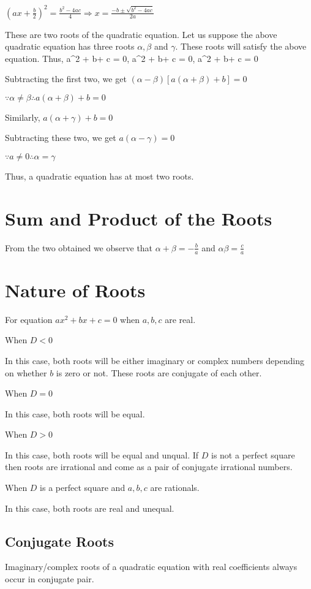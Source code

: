 $\left(ax + \frac{b}{2}\right)^2 = \frac{b^2 - 4ac}{4} \Rightarrow x = \frac{-b \pm\sqrt{b^2 - 4ac}}{2a}$

These are two roots of the quadratic equation. Let us suppose the above quadratic equation has three roots $\alpha, \beta$ and
$\gamma$. These roots will satisfy the above equation. Thus,
\startformula a\alpha^2 + b\alpha + c = 0, a\beta^2 + b\beta + c = 0, a\gamma^2 + b\gamma + c = 0\stopformula

Subtracting the first two, we get $(\alpha - \beta)[a(\alpha + \beta) + b] = 0$

$\because \alpha \neq \beta \therefore a(\alpha + \beta) + b = 0$

Similarly, $a(\alpha + \gamma) + b = 0$

Subtracting these two, we get $a(\alpha - \gamma) = 0$

$\because a\neq 0 \therefore \alpha = \gamma$

Thus, a quadratic equation has at most two roots.

\section{Sum and Product of the Roots}
From the two obtained  we observe that $\alpha + \beta = -\frac{b}{a}$ and $\alpha\beta = \frac{c}{a}$

\section{Nature of Roots}
For equation $ax^2 + bx + c = 0$ when $a,b,c$ are real.
\startitemize[n]
\item When $D < 0$

  In this case, both roots will be either imaginary or complex numbers depending on whether $b$ is zero or not. These roots are
  conjugate of each other.
\item When $D = 0$

  In this case, both roots will be equal.
\item When $D > 0$

  In this case, both roots will be equal and unqual. If $D$ is not a perfect square then roots are irrational and come as a pair of
  conjugate irrational numbers.
\item When $D$ is a perfect square and $a, b, c$ are rationals.

  In this case, both roots are real and unequal.
\stopitemize

\subsection{Conjugate Roots}
Imaginary/complex roots of a quadratic equation with real coefficients always occur in conjugate pair.

